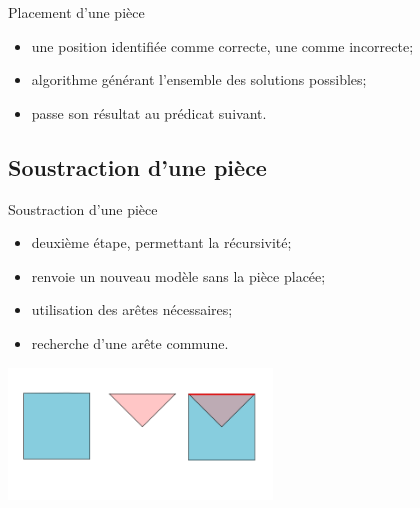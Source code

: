\documentclass{beamer}
\begin{document}
\begin{frame}{Placement d'une pièce}

	\begin{itemize}
		\item une position identifiée comme correcte, une comme incorrecte;
		\item algorithme générant l'ensemble des solutions possibles;
		\item passe son résultat au prédicat suivant.
	\end{itemize}

\end{frame}

	\subsection{Soustraction d'une pièce}

\begin{frame}{Soustraction d'une pièce}

	\begin{itemize}
		\item deuxième étape, permettant la récursivité;
		\item renvoie un nouveau modèle sans la pièce placée;
		\item utilisation des arêtes nécessaires;
		\item recherche d'une arête commune.
	\end{itemize}

	\begin{center}
		\includegraphics[width=7cm]{soustraction_arete_1}
	\end{center}

\end{frame}
\end{document}
